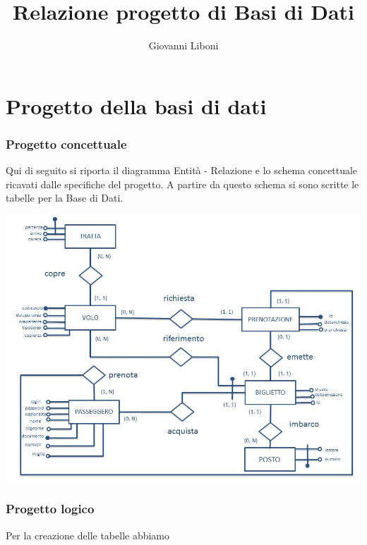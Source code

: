 \documentclass[a4paper,10pt]{report}
\title{Relazione progetto di Basi di Dati}
\author{Giovanni Liboni}
\begin{document}
\begin{frontespizio}



\end{frontespizio}

\tableofcontents

\newpage

\part{Progetto della basi di dati}

\section{Progetto concettuale}
Qui di seguito si riporta il diagramma Entit\`a - Relazione e lo schema concettuale ricavati dalle specifiche del progetto.
A partire da questo schema si sono scritte le tabelle per la Base di Dati.

\includegraphics{er.jpg}

\section{Progetto logico}
Per la creazione delle tabelle abbiamo 
\end{document}

